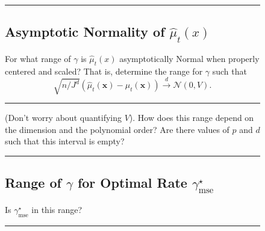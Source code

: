 \documentclass{article}
\newenvironment{colorparagraph}[1]{\par\color{#1}}{\par}
\begin{document}
\begin{figure}[H]
  \begin{colorparagraph}{questioncolor}
  \rule{\textwidth}{0.5pt}
  \label{q1e}
  \subsection{Asymptotic Normality of \(\hat{\mu}_t(x)\)}
  
  For what range of \( \gamma \) is \( \hat{\mu}_t(x) \) asymptotically Normal when properly centered and scaled? That is, determine the range for \( \gamma \) such that
  \[
  \sqrt{n / J^d} (\hat{\mu}_t(\mathbf{x}) - \mu_t(\mathbf{x})) \overset{d}{\to} \mathcal{N}(0, V).
  \]
  
  \rule{\textwidth}{0.5pt}

  (Don't worry about quantifying $V$). How does this range depend on the dimension and the polynomial order? Are there values of $p$ and $d$ such that this interval is empty?
  \end{colorparagraph}
\end{figure}

\begin{figure}[H]
  \begin{colorparagraph}{questioncolor}
  \rule{\textwidth}{0.5pt}
  \label{q1f}
  \subsection{Range of \(\gamma\) for Optimal Rate \(\gamma^\star_{\text{mse}}\)}

  Is \( \gamma^\star_{\text{mse}} \) in this range?

  \rule{\textwidth}{0.5pt}
  \end{colorparagraph}
\end{figure}
\end{document}

